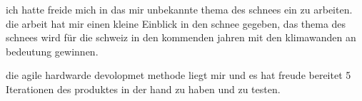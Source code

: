 ich hatte freide mich in das mir unbekannte thema des schnees ein zu arbeiten. die arbeit hat mir einen kleine Einblick in den schnee gegeben, das thema des schnees wird für die schweiz in den kommenden jahren mit den klimawanden an bedeutung gewinnen.

die agile hardwarde devolopmet methode liegt mir und es hat freude bereitet 5 Iterationen des produktes in der hand zu haben und zu testen.
